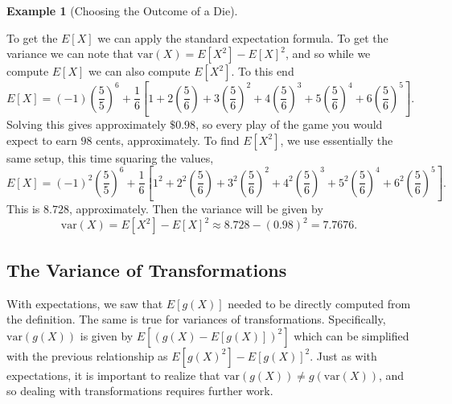 \documentclass[
  letterpaper,
  DIV=11,
  numbers=noendperiod]{scrreprt}
\theoremstyle{definition}
\theoremstyle{definition}
\newtheorem{example}{Example}[chapter]
\theoremstyle{definition}
\theoremstyle{remark}
\begin{document}
\begin{example}[Choosing the Outcome of a
Die]
\begin{tcolorbox}[enhanced jigsaw, colback=white, colframe=quarto-callout-color-frame, arc=.35mm, leftrule=.75mm, rightrule=.15mm, opacityback=0, breakable, bottomrule=.15mm, left=2mm, toprule=.15mm]
To get the \(E[X]\) we can apply the standard expectation formula. To
get the variance we can note that \(\text{var}(X) = E[X^2] - E[X]^2\),
and so while we compute \(E[X]\) we can also compute \(E[X^2]\). To this
end
\[E[X] = (-1)\left(\frac{5}{5}\right)^6 + \frac{1}{6}\left[1 + 2\left(\frac{5}{6}\right) + 3\left(\frac{5}{6}\right)^{2} + 4\left(\frac{5}{6}\right)^{3} + 5\left(\frac{5}{6}\right)^{4}+ 6\left(\frac{5}{6}\right)^{5}\right].\]
Solving this gives approximately \(\$0.98\), so every play of the game
you would expect to earn \(98\) cents, approximately. To find
\(E[X^2]\), we use essentially the same setup, this time squaring the
values,
\[E[X] = (-1)^2\left(\frac{5}{5}\right)^6 + \frac{1}{6}\left[1^2 + 2^2\left(\frac{5}{6}\right) + 3^2\left(\frac{5}{6}\right)^{2} + 4^2\left(\frac{5}{6}\right)^{3} + 5^2\left(\frac{5}{6}\right)^{4}+ 6^2\left(\frac{5}{6}\right)^{5}\right].\]
This is \(8.728\), approximately. Then the variance will be given by
\[\text{var}(X) = E[X^2] - E[X]^2 \approx 8.728 - (0.98)^2 = 7.7676.\]

\end{tcolorbox}

\end{example}

\subsection{The Variance of
Transformations}\label{the-variance-of-transformations}

With expectations, we saw that \(E[g(X)]\) needed to be directly
computed from the definition. The same is true for variances of
transformations. Specifically, \(\text{var}(g(X))\) is given by
\(E[(g(X) - E[g(X)])^2]\) which can be simplified with the previous
relationship as \(E[g(X)^2] - E[g(X)]^2\). Just as with expectations, it
is important to realize that \(\text{var}(g(X)) \neq g(\text{var}(X))\),
and so dealing with transformations requires further work.
\end{document}
